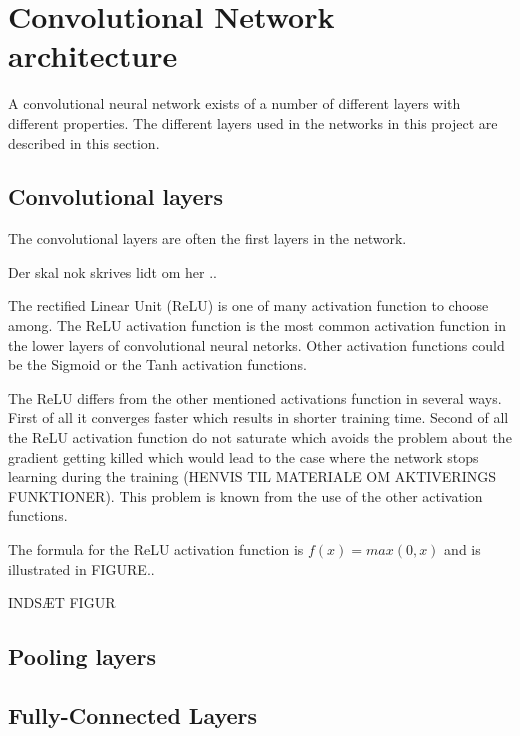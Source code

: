 \graphicspath{{Chapters/Project/}}

\section{Convolutional Network architecture} %
\label{sec:convolutional_network_architecture}

A convolutional neural network exists of a number of different layers with different properties. The different layers used in the networks in this project are described in this section. 

\subsection{Convolutional layers} %
\label{sub:conv_layers}

The convolutional layers are often the first layers in the network.

Der skal nok skrives lidt om her ..

The rectified Linear Unit (ReLU) is one of many activation function to choose among. The ReLU activation function is the most common activation function in the lower layers of convolutional neural netorks. Other activation functions could be the Sigmoid or the Tanh activation functions.

The ReLU differs from the other mentioned activations function in several ways. First of all it converges faster which results in shorter training time. Second of all the ReLU activation function do not saturate which avoids the problem about the gradient getting killed which would lead to the case where the network stops learning during the training (HENVIS TIL MATERIALE OM AKTIVERINGS FUNKTIONER). This problem is known from the use of the other activation functions. 

The formula for the ReLU activation function is $f(x)=max(0,x)$ and is illustrated in FIGURE..

INDSÆT FIGUR


\subsection{Pooling layers} %
\label{sub:pool_layers}


\subsection{Fully-Connected Layers} %
\label{sub:fc_layers}


